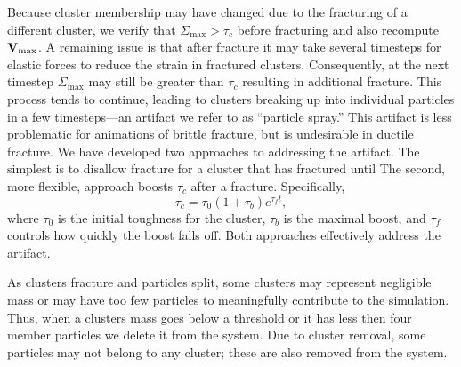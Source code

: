 \documentclass[conference]{acmsiggraph}
\begin{document}
Because cluster membership may have changed due to the fracturing of a different cluster, we verify that 
$\Sigma_{\max} > \tau_c$ before fracturing and also recompute $\mathit{\mathbf{V}}_{\max}$.  A remaining issue is that
after fracture it may take several timesteps for elastic forces to reduce the strain in fractured
clusters.  Consequently, at the next timestep $\Sigma_{\max}$ may still be greater than $\tau_c$ resulting
in additional fracture.  This process tends to continue, leading to clusters breaking up into individual particles
in a few timesteps---an artifact we refer to as ``particle
spray.''  This artifact is less problematic for animations of brittle fracture, but is undesirable in ductile
fracture.  We have developed two approaches to addressing the artifact.  The simplest is to
disallow fracture for a cluster that has fractured until   The second, more flexible,
approach boosts $\tau_c$ after a fracture.  Specifically,
\begin{equation}
\tau_c = \tau_0 (1+\tau_b)e^{\tau_ft},
\end{equation}
where $\tau_0$ is the initial toughness for the cluster, $\tau_b$ is the maximal boost, and $\tau_f$ controls
how quickly the boost falls off.  Both approaches effectively address the artifact.

As clusters fracture and particles split, some clusters may represent negligible mass or may have too
few particles to meaningfully contribute to the simulation.  Thus, when a clusters mass goes below
a threshold or it has less then four member particles we delete it from the system.  Due to cluster
removal, some particles may not belong to any cluster; these are also removed from the system.


\end{document}
